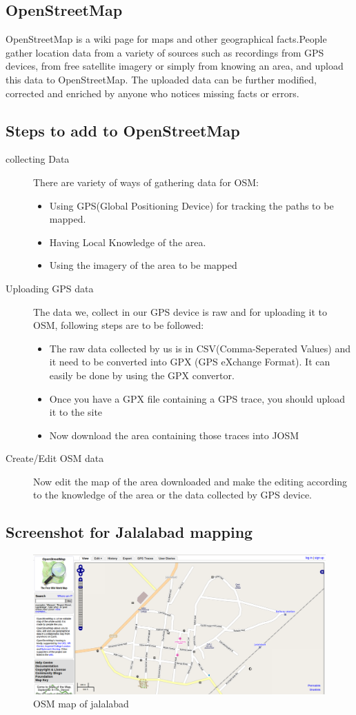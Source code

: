 \subsection{OpenStreetMap}
OpenStreetMap is a wiki page for maps and other geographical facts.People gather location data from a variety of sources such as recordings from GPS devices, from free satellite imagery or simply from knowing an area, and upload this data to OpenStreetMap. The uploaded data can be further modified, corrected and enriched by anyone who notices missing facts or errors.\\

\subsection{Steps to add to OpenStreetMap}
\begin{description}
\item[collecting Data] There are variety of ways of gathering data for OSM:
\begin{itemize}
\item Using GPS(Global Positioning Device) for tracking the paths to be mapped.
\item Having Local Knowledge of the area.
\item Using the imagery of the area to be mapped
\end{itemize}
\item[Uploading GPS data] The data we, collect in our GPS device is raw and for uploading it to OSM, following steps are to be followed:
\begin{itemize}
\item The raw data collected by us is in CSV(Comma-Seperated Values) and it need to be converted into GPX (GPS eXchange Format). It can easily be done by using the GPX convertor.
\item Once you have a GPX file containing a GPS trace, you should upload it to the site
\item Now download the area containing those traces into JOSM
\end{itemize}
\item[Create/Edit OSM data] Now edit the map of the area downloaded and make the editing according to the knowledge of the area or the data collected by GPS device.
\end{description}
\newpage
\subsection{Screenshot for Jalalabad mapping}
\begin{figure}[h]
\centering \includegraphics[scale=0.4]{ss1.png}
\caption{OSM map of jalalabad}
\end{figure}



 
